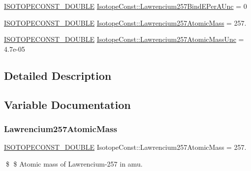 \begin{DoxyCompactItemize}
\mbox{\hyperlink{group___isotope_const-_macros_ga8f45a7272ce02c0b4c65c44636ed719a}{I\+S\+O\+T\+O\+P\+E\+C\+O\+N\+S\+T\+\_\+\+D\+O\+U\+B\+LE}} \mbox{\hyperlink{group___isotope_const-_lawrencium-_lr257_gaddea1b717efc3a337aad03499b5f2627}{Isotope\+Const\+::\+Lawrencium257\+Bind\+E\+Per\+A\+Unc}} = 0
\item 
\mbox{\hyperlink{group___isotope_const-_macros_ga8f45a7272ce02c0b4c65c44636ed719a}{I\+S\+O\+T\+O\+P\+E\+C\+O\+N\+S\+T\+\_\+\+D\+O\+U\+B\+LE}} \mbox{\hyperlink{group___isotope_const-_lawrencium-_lr257_ga36a14289db8d1d3430134e6f0c23a6ad}{Isotope\+Const\+::\+Lawrencium257\+Atomic\+Mass}} = 257.
\item 
\mbox{\hyperlink{group___isotope_const-_macros_ga8f45a7272ce02c0b4c65c44636ed719a}{I\+S\+O\+T\+O\+P\+E\+C\+O\+N\+S\+T\+\_\+\+D\+O\+U\+B\+LE}} \mbox{\hyperlink{group___isotope_const-_lawrencium-_lr257_ga034b20435fd7b1e664ee200009751418}{Isotope\+Const\+::\+Lawrencium257\+Atomic\+Mass\+Unc}} = 4.\+7e-\/05
\end{DoxyCompactItemize}


\subsection{Detailed Description}


\subsection{Variable Documentation}
\mbox{\label{group___isotope_const-_lawrencium-_lr257_ga36a14289db8d1d3430134e6f0c23a6ad}} 
\subsubsection{\texorpdfstring{Lawrencium257\+Atomic\+Mass}{Lawrencium257AtomicMass}}
{\footnotesize\ttfamily \mbox{\hyperlink{group___isotope_const-_macros_ga8f45a7272ce02c0b4c65c44636ed719a}{I\+S\+O\+T\+O\+P\+E\+C\+O\+N\+S\+T\+\_\+\+D\+O\+U\+B\+LE}} Isotope\+Const\+::\+Lawrencium257\+Atomic\+Mass = 257.}

\$ \$ Atomic mass of Lawrencium-\/257 in amu. \mbox{\label{group___isotope_const-_lawrencium-_lr257_ga034b20435fd7b1e664ee200009751418}} 
